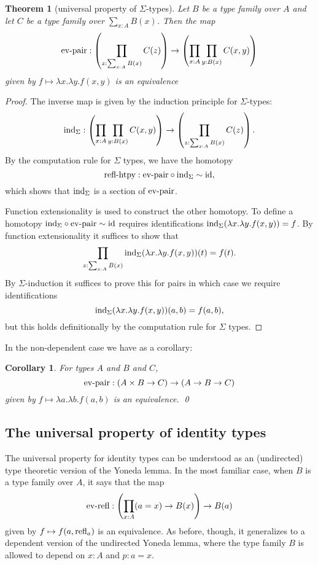 \documentclass{amsart}
\theoremstyle{theorem}
\newtheorem*{thm}{Theorem}
\newtheorem*{cor}{Corollary}
\theoremstyle{definition}
\theoremstyle{remark}
\newcommand{\0}{\mathbbe{0}}
\newcommand{\1}{\mathbbe{1}}
\newcommand{\2}{\mathbbe{2}}
\newcommand{\3}{\mathbbe{3}}
\newcommand{\4}{\mathbbe{4}}
\newcommand{\term}[1]{{\textup{#1}}}
\newcommand{\id}{\term{id}}
\newcommand{\ind}{\term{ind}}
\newcommand{\refl}{\term{refl}}
\begin{document}
\begin{thm}[universal property of \texorpdfstring{$\Sigma$}{Sigma}-types]
Let $B$ be a type family over $A$ and let $C$ be a type family over $\sum_{x:A}B(x)$. Then the map
\[ \term{ev-pair} : \left( \prod_{z: \sum_{x:A}B(x)} C(z) \right) \to \left( \prod_{x:A}\prod_{y:B(x)} C(x,y) \right)\]
given by $f \mapsto \lambda x.\lambda y. f(x,y)$ is an equivalence
\end{thm}
\begin{proof}
The inverse map is given by the induction principle for $\Sigma$-types:
\[ \ind_\Sigma : \left( \prod_{x:A}\prod_{y:B(x)} C(x,y) \right) \to \left( \prod_{z: \sum_{x:A}B(x)} C(z) \right) .\]
By the computation rule for $\Sigma$ types, we have the homotopy
\[ \term{refl-htpy} : \term{ev-pair} \circ\ind_\Sigma \sim \id,\]
which shows that $\ind_\Sigma$ is a section of $\term{ev-pair}$.

Function extensionality is used to construct the other homotopy. To define a homotopy $\ind_\Sigma \circ \term{ev-pair} \sim \id$ requires identifications $\ind_\Sigma(\lambda x. \lambda y. f(x,y)) = f$. By function extensionality it suffices to show that
\[ \prod_{z: \sum_{x:A}B(x)} \ind_\Sigma(\lambda x. \lambda y. f(x,y))(t) = f(t).\] By $\Sigma$-induction it suffices to prove this for pairs in which case we require identifications
\[ \ind_\Sigma(\lambda x. \lambda y. f(x,y))(a,b) = f(a,b),\]
but this holds definitionally by the computation rule for $\Sigma$ types.
\end{proof}

In the non-dependent case we have as a corollary:

\begin{cor} For types $A$ and $B$ and $C$,
\[ \term{ev-pair} : (A \times B \to C) \to (A \to B \to C)\]
given by $f \mapsto \lambda a. \lambda b. f(a,b)$ is an equivalence. \qed
\end{cor}

\subsection*{The universal property of identity types}

The universal property for identity types can be understood as an (undirected) type theoretic version of the Yoneda lemma. In the most familiar case, when $B$ is a type family over $A$, it says that the map
\[ \term{ev-refl} : \left( \prod_{x:A}(a=x) \to B(x) \right) \to B(a)\]
given by $f \mapsto f(a,\refl_a)$ is an equivalence. As before, though, it generalizes to a dependent version of the undirected Yoneda lemma, where the type family $B$ is allowed to depend on $x :A$ and $p: a =x$.
\end{document}
